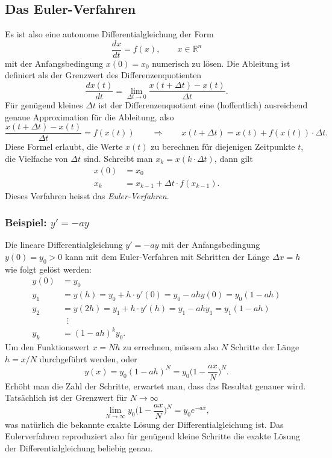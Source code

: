 %
%
%
\subsection{Das Euler-Verfahren\label{subsection:euler}}
Es ist also eine autonome Differentialgleichung der Form
\[
\frac{dx}{dt} = f(x),\qquad x\in\mathbb R^n
\]
mit der Anfangsbedingung $x(0)=x_0$ numerisch zu lösen.
Die Ableitung ist definiert als der Grenzwert des Differenzenquotienten
\[
\frac{dx(t)}{dt}
=
\lim_{\Delta t\to 0}
\frac{x(t+\Delta t)-x(t)}{\Delta t}.
\]
Für genügend kleines $\Delta t$ ist der Differenzenquotient eine
(hoffentlich) ausreichend genaue Approximation für die Ableitung,
also
\begin{equation}
\frac{x(t+\Delta t)-x(t)}{\Delta t} = f(x(t))
\qquad\Rightarrow\qquad
x(t+\Delta t) = x(t) + f(x(t))\cdot \Delta t.
\label{skript:euler:differenzenquotient}
\end{equation}
Diese Formel erlaubt, die Werte $x(t)$ zu berechnen für diejenigen
Zeitpunkte $t$, die Vielfache von $\Delta t$ sind.
Schreibt man $x_k = x(k\cdot \Delta t)$, dann gilt
\begin{align*}
x(0) &= x_0\\
x_k &= x_{k-1} + \Delta t \cdot f(x_{k-1}).
\end{align*}
Dieses Verfahren heisst das {\em Euler-Verfahren}.
%

\subsubsection{Beispiel: $y'=-ay$}
Die lineare Differentialgleichung $y'=-ay$ mit der Anfangsbedingung 
$y(0)=y_0 > 0$ kann mit dem Euler-Verfahren mit Schritten der Länge $\Delta x=h$
wie folgt gelöst werden:
\begin{align*}
y(0)&=y_0\\
y_1&=y(h) = y_0 + h\cdot y'(0) = y_0  -ah y(0) = y_0(1 - ah)
\\
y_2&=y(2h) = y_1 + h\cdot y'(h) = y_1  -ah y_1 = y_1(1-ah)
\\
&\;\;\vdots
\\
y_k&= (1-ah)^k y_0.
\end{align*}
Um den Funktionswert $x=Nh$ zu errechnen, müssen also $N$ Schritte der
Länge $h=x/N$ durchgeführt werden, oder
\[
y(x) = y_0(1-ah)^N =
y_0
\biggl(
1-\frac{ax}{N}
\biggr)^N.
\]
Erhöht man die Zahl der Schritte, erwartet man, dass das Resultat genauer
wird.
Tatsächlich ist der Grenzwert für $N\to\infty$
\[
\lim_{N\to\infty} y_0\biggl(1-\frac{ax}{N}\biggr)^N
=
y_0
e^{-ax},
\]
was natürlich die bekannte exakte Lösung der Differentialgleichung ist.
Das Eulerverfahren reproduziert also für genügend kleine Schritte 
die exakte Lösung der Differentialgleichung beliebig genau.

